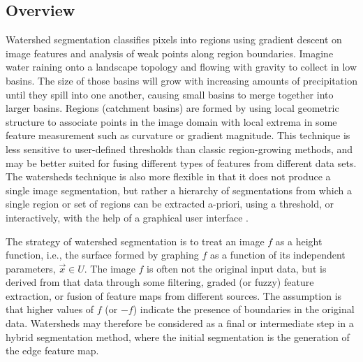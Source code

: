 %
%
%
%

\subsection{Overview}
\label{sec:AboutWatersheds}
Watershed segmentation classifies pixels into regions using gradient descent on
image features and analysis of weak points along region boundaries.  Imagine
water raining onto a landscape topology and flowing with gravity to collect in
low basins.  The size of those basins will grow with increasing amounts of
precipitation until they spill into one another, causing small basins to merge
together into larger basins.  Regions (catchment basins) are formed by using
local geometric structure to associate points in the image domain with local
extrema in some feature measurement such as curvature or gradient magnitude.
This technique is less sensitive to user-defined thresholds than classic
region-growing methods, and may be better suited for fusing different types of
features from different data sets.  The watersheds technique is also more
flexible in that it does not produce a single image segmentation, but rather a
hierarchy of segmentations from which a single region or set of regions can be
extracted a-priori, using a threshold, or interactively, with the help of a
graphical user interface
\cite{Yoo1992,Yoo1991}.

The strategy of watershed segmentation is to treat an image $f$ as a height
function, i.e.,  the surface formed by graphing $f$ as a function of its
independent parameters, $\vec{x} \in U$.  The image $f$ is often not the
original input data, but is derived from that data through some filtering,
graded (or fuzzy) feature extraction, or fusion of feature maps from different
sources.  The assumption is that higher values of $f$ (or $-f$) indicate the
presence of boundaries in the original data.  Watersheds may therefore be
considered as a final or intermediate step in a hybrid segmentation method,
where the initial segmentation is the generation of the edge feature map.

